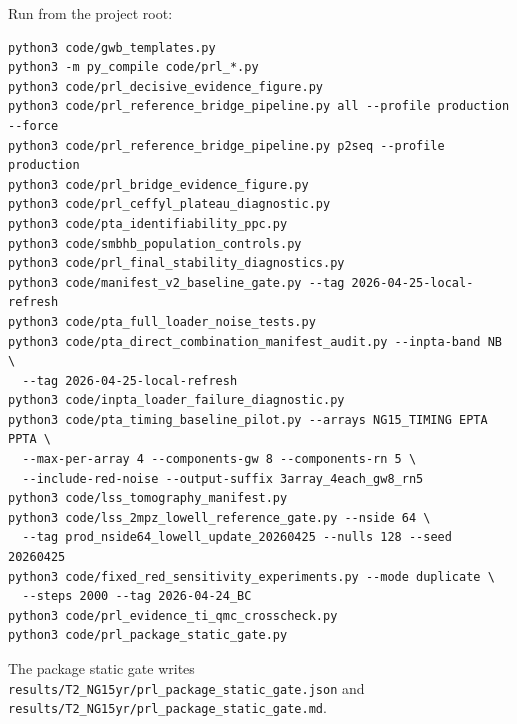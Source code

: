 \documentclass[aps,prl,superscriptaddress,nofootinbib]{revtex4-2}
\begin{document}
Run from the project root:
\begin{verbatim}
python3 code/gwb_templates.py
python3 -m py_compile code/prl_*.py
python3 code/prl_decisive_evidence_figure.py
python3 code/prl_reference_bridge_pipeline.py all --profile production --force
python3 code/prl_reference_bridge_pipeline.py p2seq --profile production
python3 code/prl_bridge_evidence_figure.py
python3 code/prl_ceffyl_plateau_diagnostic.py
python3 code/pta_identifiability_ppc.py
python3 code/smbhb_population_controls.py
python3 code/prl_final_stability_diagnostics.py
python3 code/manifest_v2_baseline_gate.py --tag 2026-04-25-local-refresh
python3 code/pta_full_loader_noise_tests.py
python3 code/pta_direct_combination_manifest_audit.py --inpta-band NB \
  --tag 2026-04-25-local-refresh
python3 code/inpta_loader_failure_diagnostic.py
python3 code/pta_timing_baseline_pilot.py --arrays NG15_TIMING EPTA PPTA \
  --max-per-array 4 --components-gw 8 --components-rn 5 \
  --include-red-noise --output-suffix 3array_4each_gw8_rn5
python3 code/lss_tomography_manifest.py
python3 code/lss_2mpz_lowell_reference_gate.py --nside 64 \
  --tag prod_nside64_lowell_update_20260425 --nulls 128 --seed 20260425
python3 code/fixed_red_sensitivity_experiments.py --mode duplicate \
  --steps 2000 --tag 2026-04-24_BC
python3 code/prl_evidence_ti_qmc_crosscheck.py
python3 code/prl_package_static_gate.py
\end{verbatim}

The package static gate writes
\nolinkurl{results/T2_NG15yr/prl_package_static_gate.json} and
\nolinkurl{results/T2_NG15yr/prl_package_static_gate.md}.
\end{document}

